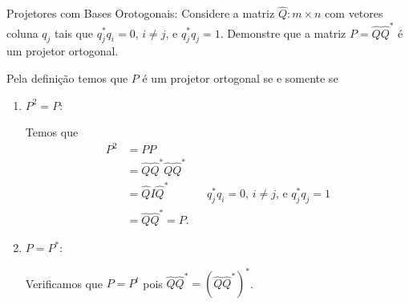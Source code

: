 \documentclass[a4paper,12pt, leqno, answers]{exam}
\begin{document}
\begin{questions}
\begin{solution}
\begin{center}
        \end{center}
    \end{solution}

    \question Projetores com Bases Orotogonais: Considere a matriz $\hat{Q} : m \times n$ com vetores coluna $q_j$ tais que $q_j^* q_i = 0$, $i \neq j$, e $q_j^* q_j = 1$. Demonstre que a matriz $P = \hat{Q} \hat{Q}^*$ \'{e} um projetor ortogonal.
    \begin{solution}
        Pela defini\c{c}\~{a}o temos que $P$ \'{e} um projetor ortogonal se e somente se
        \begin{enumerate}
            \item $P^2 = P$:
                
                Temos que
                \begin{align*}
                    P^2 &= P P \\
                    &= \hat{Q} \hat{Q}^* \hat{Q} \hat{Q}^* \\
                    &= \hat{Q} I \hat{Q}^* && \text{$q_j^* q_i = 0$, $i \neq j$, e $q_j^* q_j = 1$} \\
                    &= \hat{Q} \hat{Q}^* = P.
                \end{align*}

            \item $P = P^*$:
                
                Verificamos que $P = P^t$ pois $\hat{Q} \hat{Q}^* = \left( \hat{Q} \hat{Q}^* \right)^*$.
        \end{enumerate}
    \end{solution}


\end{questions}
\end{document}
